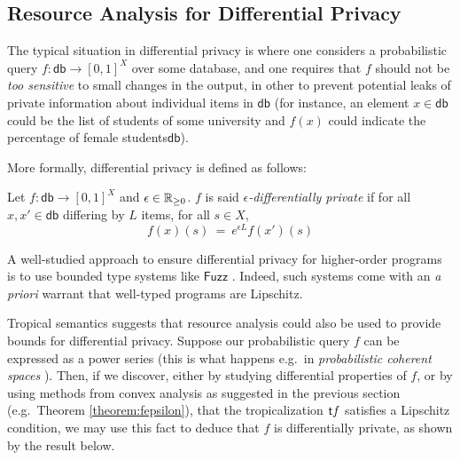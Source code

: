 

\subsection{Resource Analysis for Differential Privacy}

The typical situation in differential privacy is where one considers a probabilistic query $f: \mathsf{db}\to [0,1]^{X}$ over some database, and one requires that $f$ should not be \emph{too sensitive} to small changes in the output, in other to prevent potential leaks of private information about individual items in $\mathsf{db}$ (for instance, an element $x\in\mathsf{db}$ could be the list of students of some university and $f(x)$ could indicate the percentage of female students$\mathsf{db}$).

More formally, differential privacy is defined as follows:
\begin{definition}
Let $f: \mathsf{db}\to [0,1]^{X}$ and $\epsilon \in \mathbb{R}_{\geq 0}$. $f$ is said \emph{$\epsilon$-differentially private} if for all $x,x'\in \mathsf{db}$
differing by $L$ items, for all $s\in X$, 
$$
f(x)(s) \ = \ e^{\epsilon L} f(x')(s)
$$
\end{definition}

A well-studied approach to ensure differential privacy for higher-order programs is to use bounded type systems like $\mathsf{Fuzz}$ \cite{Reed2010}. Indeed, such systems come with an \emph{a priori} warrant that well-typed programs are Lipschitz.

Tropical semantics suggests that resource analysis could also be used to provide bounds for differential privacy. 
Suppose our probabilistic query $f$ can be expressed as a power series (this is what happens e.g.~in \emph{probabilistic coherent spaces} \cite{Ehrhard2011}). Then, if we discover, either by studying differential properties of $f$, or by using methods from convex analysis as suggested in the previous section (e.g.~Theorem \ref{theorem:fepsilon}), 
 that the tropicalization $\mathsf{t} f$ satisfies a Lipschitz condition, we may use this fact to deduce that $f$ is differentially private, as shown by the result below.

%
%


